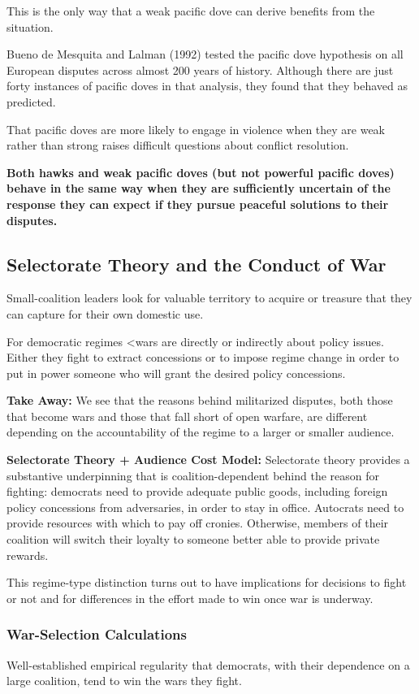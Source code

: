 This is the only way that a weak pacific dove can derive benefits from the situation.

Bueno de Mesquita and Lalman (1992) tested the pacific dove hypothesis on all European disputes across almost 200 years of history. Although there are just forty instances of pacific doves in that analysis, they found that they behaved as predicted.

That pacific doves are more likely to engage in violence when they are weak rather than strong raises difficult questions about conflict resolution.

\textbf{Both hawks and weak pacific doves (but not powerful pacific doves) behave in the same way when they are sufficiently uncertain of the response they can expect if they pursue peaceful solutions to their disputes.}

\subsection{Selectorate Theory and the Conduct of War}

Small-coalition leaders look for valuable territory to acquire or treasure that they can capture for their own domestic use.

For democratic regimes <wars are directly or indirectly about policy issues. Either they fight to extract concessions or to impose regime change in order to put in power someone who will grant the desired policy concessions.

\textbf{Take Away:} We see that the reasons behind militarized disputes, both those that become wars and those that fall short of open warfare, are different depending on the accountability of the regime to a larger or smaller audience.

\textbf{Selectorate Theory + Audience Cost Model:}
Selectorate theory provides a substantive underpinning that is coalition-dependent behind the reason for fighting: democrats need to provide adequate public goods, including foreign policy concessions from adversaries, in order to stay in office. Autocrats need to provide resources with which to pay off cronies. Otherwise, members of their coalition will switch their loyalty to someone better able to provide private rewards.

This regime-type distinction turns out to have implications for decisions to fight or not and for differences in the effort made to win once war is underway.

\subsubsection{War-Selection Calculations}
Well-established empirical regularity that democrats, with their dependence on a large coalition, tend to win the wars they fight.

